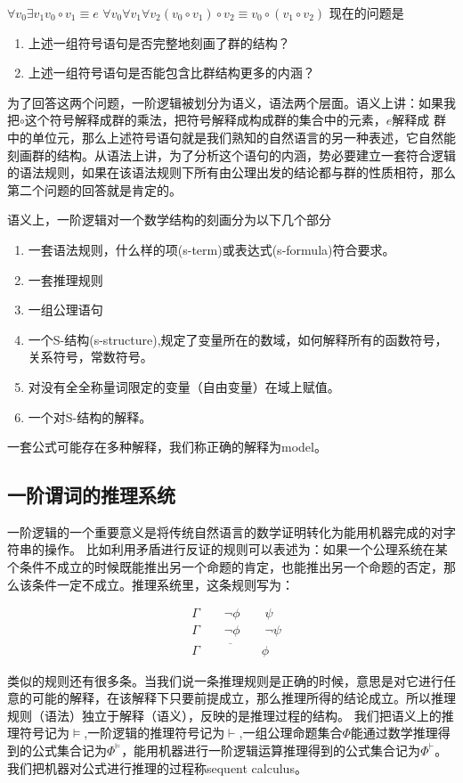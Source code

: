        $\forall v_0 \exists v_1 v_0 \circ v_1 \equiv e$
       $\forall v_0\forall v_1 \forall v_2 (v_0 \circ v_1) \circ v_2\equiv v_0 \circ (v_1 \circ v_2)$
       现在的问题是
			 \begin{enumerate}
			 	\item 上述一组符号语句是否完整地刻画了群的结构？
				\item 上述一组符号语句是否能包含比群结构更多的内涵？
			 \end{enumerate}

			 为了回答这两个问题，一阶逻辑被划分为语义，语法两个层面。语义上讲：如果我把$\circ$这个符号解释成群的乘法，把符号解释成构成群的集合中的元素，$e$解释成
			 群中的单位元，那么上述符号语句就是我们熟知的自然语言的另一种表述，它自然能刻画群的结构。从语法上讲，为了分析这个语句的内涵，势必要建立一套符合逻辑的语法规则，如果在该语法规则下所有由公理出发的结论都与群的性质相符，那么第二个问题的回答就是肯定的。

		   语义上，一阶逻辑对一个数学结构的刻画分为以下几个部分
			 \begin{enumerate}
				\item 一套语法规则，什么样的项(s-term)或表达式(s-formula)符合要求。
				\item 一套推理规则
				\item 一组公理语句
			 	\item 一个S-结构(s-structure),规定了变量所在的数域，如何解释所有的函数符号，关系符号，常数符号。
        \item 对没有全全称量词限定的变量（自由变量）在域上赋值。
				\item 一个对S-结构的解释。
			 \end{enumerate}
        一套公式可能存在多种解释，我们称正确的解释为model。
\subsection{一阶谓词的推理系统}
  一阶逻辑的一个重要意义是将传统自然语言的数学证明转化为能用机器完成的对字符串的操作。
比如利用矛盾进行反证的规则可以表述为：如果一个公理系统在某个条件不成立的时候既能推出另一个命题的肯定，也能推出另一个命题的否定，那么该条件一定不成立。推理系统里，这条规则写为：
\begin{center}
	\begin{align}
		&\Gamma   \qquad      \lnot  \phi    \qquad   \psi   \\
		&\Gamma   \qquad      \lnot  \phi    \qquad   \lnot\psi   \\
		&\overline{\Gamma     \qquad \qquad     \quad  \phi}
	\end{align}
\end{center}
   类似的规则还有很多条。当我们说一条推理规则是正确的时候，意思是对它进行任意的可能的解释，在该解释下只要前提成立，那么推理所得的结论成立。所以推理规则（语法）独立于解释（语义），反映的是推理过程的结构。
	 我们把语义上的推理符号记为$\models$,一阶逻辑的推理符号记为$\vdash$,一组公理命题集合$\Phi$能通过数学推理得到的公式集合记为$\Phi^{\models}$，能用机器进行一阶逻辑运算推理得到的公式集合记为$\Phi^{\vdash}$。我们把机器对公式进行推理的过程称sequent calculus。


